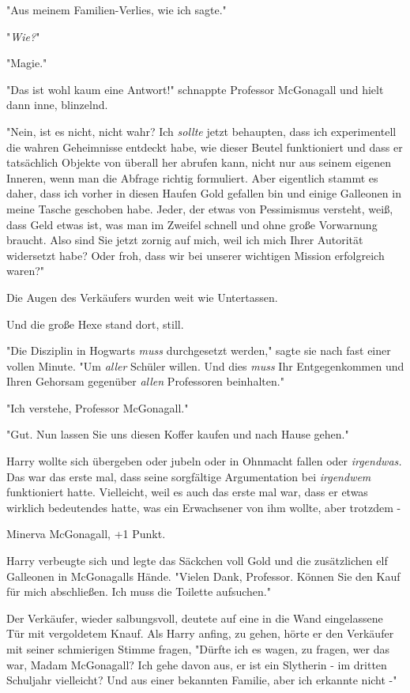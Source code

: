 {"Aus meinem Familien-Verlies, wie ich sagte."

"\emph{Wie?}"

"Magie."

"Das ist wohl kaum eine Antwort!" schnappte Professor McGonagall und hielt dann inne, blinzelnd.

"Nein, ist es nicht, nicht wahr? Ich \emph{sollte} jetzt behaupten, dass ich experimentell die wahren Geheimnisse entdeckt habe, wie dieser Beutel funktioniert und dass er tatsächlich Objekte von überall her abrufen kann, nicht nur aus seinem eigenen Inneren, wenn man die Abfrage richtig formuliert. Aber eigentlich stammt es daher, dass ich vorher in diesen Haufen Gold gefallen bin und einige Galleonen in meine Tasche geschoben habe. Jeder, der etwas von Pessimismus versteht, weiß, dass Geld etwas ist, was man im Zweifel schnell und ohne große Vorwarnung braucht. Also sind Sie jetzt zornig auf mich, weil ich mich Ihrer Autorität widersetzt habe? Oder froh, dass wir bei unserer wichtigen Mission erfolgreich waren?"

Die Augen des Verkäufers wurden weit wie Untertassen.

Und die große Hexe stand dort, still.

"Die Disziplin in Hogwarts \emph{muss} durchgesetzt werden," sagte sie nach fast einer vollen Minute. "Um \emph{aller} Schüler willen. Und dies \emph{muss} Ihr Entgegenkommen und Ihren Gehorsam gegenüber \emph{allen} Professoren beinhalten."

"Ich verstehe, Professor McGonagall."

"Gut. Nun lassen Sie uns diesen Koffer kaufen und nach Hause gehen."

Harry wollte sich übergeben oder jubeln oder in Ohnmacht fallen oder \emph{irgendwas.} Das war das erste mal, dass seine sorgfältige Argumentation bei \emph{irgendwem} funktioniert hatte. Vielleicht, weil es auch das erste mal war, dass er etwas wirklich bedeutendes hatte, was ein Erwachsener von ihm wollte, aber trotzdem -

Minerva McGonagall, +1 Punkt.

Harry verbeugte sich und legte das Säckchen voll Gold und die zusätzlichen elf Galleonen in McGonagalls Hände. "Vielen Dank, Professor. Können Sie den Kauf für mich abschließen. Ich muss die Toilette aufsuchen."

Der Verkäufer, wieder salbungsvoll, deutete auf eine in die Wand eingelassene Tür mit vergoldetem Knauf. Als Harry anfing, zu gehen, hörte er den Verkäufer mit seiner schmierigen Stimme fragen, "Dürfte ich es wagen, zu fragen, wer das war, Madam McGonagall? Ich gehe davon aus, er ist ein Slytherin - im dritten Schuljahr vielleicht? Und aus einer bekannten Familie, aber ich erkannte nicht -"

}
